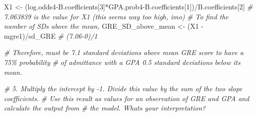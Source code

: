 \documentclass[
]{article}
\newenvironment{Shaded}{\begin{snugshade}}{\end{snugshade}}
\newcommand{\CommentTok}[1]{\textcolor[rgb]{0.56,0.35,0.01}{\textit{#1}}}
\newcommand{\DecValTok}[1]{\textcolor[rgb]{0.00,0.00,0.81}{#1}}
\newcommand{\FunctionTok}[1]{\textcolor[rgb]{0.00,0.00,0.00}{#1}}
\newcommand{\NormalTok}[1]{#1}
\newcommand{\OtherTok}[1]{\textcolor[rgb]{0.56,0.35,0.01}{#1}}
\newcommand{\SpecialCharTok}[1]{\textcolor[rgb]{0.00,0.00,0.00}{#1}}
\begin{document}
\begin{Shaded}
\begin{Highlighting}[]
\NormalTok{X1 }\OtherTok{\textless{}{-}}\NormalTok{ (log.odds4}\SpecialCharTok{{-}}\NormalTok{B.coefficients[}\DecValTok{3}\NormalTok{]}\SpecialCharTok{*}\NormalTok{GPA.prob4}\SpecialCharTok{{-}}\NormalTok{B.coefficients[}\DecValTok{1}\NormalTok{])}\SpecialCharTok{/}\NormalTok{B.coefficients[}\DecValTok{2}\NormalTok{]}
    \CommentTok{\# 7.063839 is the value for X1 (this seems way too high, imo)}
\CommentTok{\# To find the number of SDs above the mean, }
\NormalTok{GRE\_SD\_above\_mean }\OtherTok{\textless{}{-}}\NormalTok{ (X1 }\SpecialCharTok{{-}}\NormalTok{ mgre1)}\SpecialCharTok{/}\NormalTok{sd\_GRE }\CommentTok{\# (7.06{-}0)/1}

\CommentTok{\# Therefore, must be 7.1 standard deviations above mean GRE score to have a 75\% probability}
\CommentTok{\# of admittance with a GPA 0.5 standard deviations below its mean.  }


\CommentTok{\# 5.    Multiply the intercept by {-}1. Divide this value by the sum of the two slope coefficients. }
\CommentTok{\#     Use this result as values for an observation of GRE and GPA and calculate the output from }
\CommentTok{\#     the model. What\textquotesingle{}s your interpretation? }
\end{Highlighting}
\end{Shaded}

\begin{Shaded}
\end{Shaded}
\end{document}
